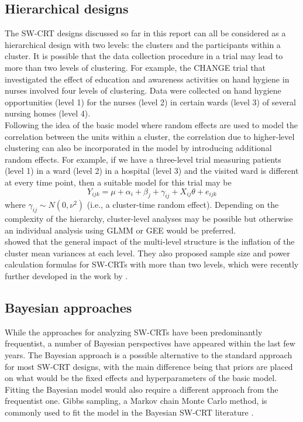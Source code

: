 \documentclass[10pt]{article}
\begin{document}
\subsection{Hierarchical designs}

The SW-CRT designs discussed so far in this report can all be considered as a hierarchical design with two levels: the clusters and the participants within a cluster. It is possible that the data collection procedure in a trial may lead to more than two levels of clustering. For example, the CHANGE trial \parencite{Lescure:2021} that investigated the effect of education and awareness activities on hand hygiene in nurses involved four levels of clustering. Data were collected on hand hygiene opportunities (level 1) for the nurses (level 2) in certain wards (level 3) of several nursing homes (level 4).
\\

Following the idea of the basic model where random effects are used to model the correlation between the units within a cluster, the correlation due to higher-level clustering can also be incorporated in the model by introducing additional random effects. For example, if we have a three-level trial measuring patients (level 1) in a ward (level 2) in a hospital (level 3) and the visited ward is different at every time point, then a suitable model for this trial may be
\[
Y_{ijk} = \mu + \alpha_i + \beta_j + \gamma_{ij} + X_{ij}\theta + e_{ijk}
\]
where $\gamma_{ij}\sim N(0,\nu^2)$ (i.e., a cluster-time random effect). Depending on the complexity of the hierarchy, cluster-level analyses may be possible but otherwise an individual analysis using GLMM or GEE would be preferred.
\\

\textcite{Teerenstra:2019} showed that the general impact of the multi-level structure is the inflation of the cluster mean variances at each level. They also proposed sample size and power calculation formulas for SW-CRTs with more than two levels, which were recently further developed in the work by \textcite{DavisPlourde:2021}.

\subsection{Bayesian approaches}

While the approaches for analyzing SW-CRTs have been predominantly frequentist, a number of Bayesian perspectives have appeared within the last few years. The Bayesian approach is a possible alternative to the standard approach for most SW-CRT designs, with the main difference being that priors are placed on what would be the fixed effects and hyperparameters of the basic model. Fitting the Bayesian model would also require a different approach from the frequentist one. Gibbs sampling, a Markov chain Monte Carlo method, is commonly used to fit the model in the Bayesian SW-CRT literature \parencite{Cunanan:2016,Zhan:2021}.
\\
\end{document}
